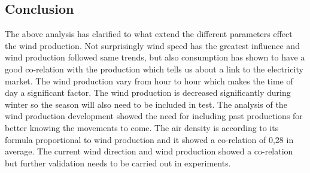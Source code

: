 
\subsection{Conclusion}
The above analysis has clarified to what extend the different parameters effect the wind production. Not surprisingly wind speed has the greatest influence and wind production followed same trends, but also consumption has shown to have a good co-relation with the production which tells us about a link to the electricity market. The wind production vary from hour to hour which makes the time of day a significant factor. The wind production is decreased significantly during winter so the season will also need to be included in test. The analysis of the wind production development showed the need for including past productions for better knowing the movements to come.
The air density is according to its formula proportional to wind production and it showed a co-relation of 0,28 in average. The current wind direction and wind production showed a co-relation but further validation needs to be carried out in experiments.

